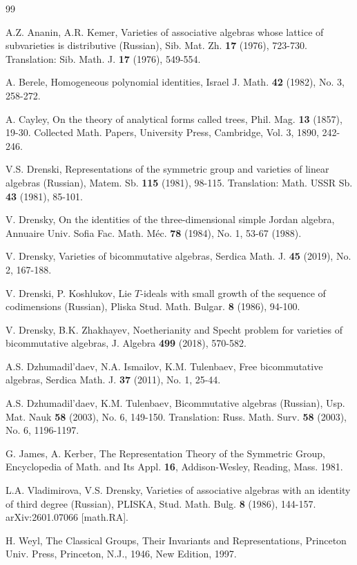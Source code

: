 \documentclass{amsart}
\theoremstyle{definition}
\begin{document}
\begin{thebibliography}{99}

A.Z. Ananin, A.R. Kemer,
Varieties of associative algebras whose lattice of subvarieties is distributive (Russian),
Sib. Mat. Zh. {\bf 17} (1976), 723-730.
Translation: Sib. Math. J. {\bf 17} (1976), 549-554.

A. Berele,
Homogeneous polynomial identities,
Israel J. Math.  {\bf 42}  (1982), No. 3, 258-272.

A. Cayley,
On the theory of analytical forms called trees,
Phil. Mag. {\bf 13} (1857), 19-30.
Collected Math. Papers, University Press, Cambridge, Vol. 3, 1890, 242-246.

V.S. Drenski,
Representations of the symmetric group and varieties of linear algebras (Russian),
Matem. Sb. {\bf 115} (1981), 98-115.
Translation: Math. USSR Sb. {\bf 43} (1981), 85-101.

V. Drensky,
On the identities of the three-dimensional simple Jordan algebra,
Annuaire Univ. Sofia Fac. Math. M\'ec. {\bf 78} (1984), No. 1, 53-67 (1988).

V. Drensky,
Varieties of bicommutative algebras,
Serdica Math. J. {\bf 45} (2019), No. 2, 167-188.

V. Drenski, P. Koshlukov,
Lie $T$-ideals with small growth of the sequence of codimensions (Russian),
Pliska Stud. Math. Bulgar. {\bf 8} (1986), 94-100.

V. Drensky, B.K. Zhakhayev,
Noetherianity and Specht problem
for varieties of bicommutative algebras,
J. Algebra {\bf 499} (2018), 570-582.

A.S. Dzhumadil'daev, N.A. Ismailov, K.M. Tulenbaev,
Free bicommutative algebras,
Serdica Math. J. {\bf 37} (2011), No. 1, 25-44.

A.S. Dzhumadil'daev, K.M. Tulenbaev,
Bicommutative algebras (Russian),
Usp. Mat. Nauk {\bf 58} (2003), No. 6, 149-150.
Translation: Russ. Math. Surv. {\bf 58} (2003), No. 6, 1196-1197.

G. James, A. Kerber,
The Representation Theory of the Symmetric Group,
Encyclopedia of Math. and Its Appl. {\bf 16},
Addison-Wesley, Reading, Mass. 1981.

L.A. Vladimirova, V.S. Drensky,
Varieties of associative algebras with an identity of third degree (Russian),
PLISKA, Stud. Math. Bulg. {\bf 8} (1986), 144-157.
arXiv:2601.07066 [math.RA].

H. Weyl,
The Classical Groups, Their Invariants and Representations,
Princeton Univ. Press, Princeton, N.J., 1946,
New Edition, 1997.

\end{thebibliography}
\end{document}
